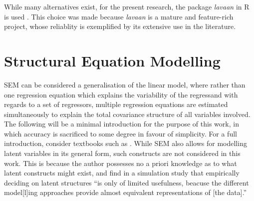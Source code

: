 While many alternatives exist, for the present research, the package \textit{lavaan} in R is used \cite{rosseel2012lavaan}.
This choice was made because \textit{lavaan} is a mature and feature-rich project, whose reliablity is exemplified by its
extensive use in the literature.

\section{Structural Equation Modelling}
\label{sec:methods:sem}
SEM can be considered a generalisation of the linear model, where rather than one regression equation which explains
the variability of the regressand with regards to a set of regressors, multiple regression equations are estimated simultaneously
to explain the total covariance structure of all variables involved.
The following will be a minimal introduction for the purpose of this work, in which accuracy is sacrificed to some degree
in favour of simplicity.
For a full introduction, consider textbooks such as .
While SEM also allows for modelling latent variables in its general form, such constructs are not considered
in this work. This is because the author possesses no a priori knowledge as to what latent constructs might exist, and
 find in a simulation study that empirically deciding on latent structures ``is only
of limited usefulness, beacuse the different model[l]ing approaches provide almost equivalent representations of [the data].''

